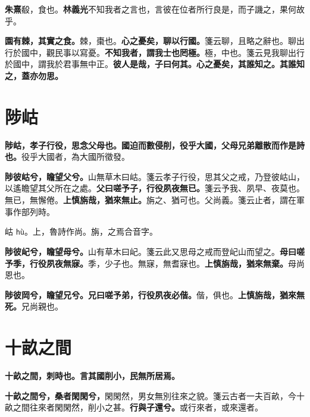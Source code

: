 \begin{quoting}\textbf{朱熹}殽，食也。\textbf{林義光}不知我者之言也，言彼在位者所行良是，而子譏之，果何故乎。\end{quoting}

\textbf{園有棘，其實之食。}{\footnotesize 棘，棗也。}\textbf{心之憂矣，聊以行國。}{\footnotesize 箋云聊，且略之辭也。聊出行於國中，觀民事以寫憂。}\textbf{不知我者，謂我士也罔極。}{\footnotesize 極，中也。箋云見我聊出行於國中，謂我於君事無中正。}\textbf{彼人是哉，子曰何其。心之憂矣，其誰知之。其誰知之，蓋亦勿思。}

\section{陟岵}


\textbf{陟岵，孝子行役，思念父母也。國迫而數侵削，役乎大國，父母兄弟離散而作是詩也。}{\footnotesize 役乎大國者，為大國所徵發。}

\textbf{陟彼岵兮，瞻望父兮。}{\footnotesize 山無草木曰岵。箋云孝子行役，思其父之戒，乃登彼岵山，以遙瞻望其父所在之處。}\textbf{父曰嗟予子，行役夙夜無已。}{\footnotesize 箋云予我、夙早、夜莫也。無已，無懈倦。}\textbf{上慎旃哉，猶來無止。}{\footnotesize 旃之、猶可也。父尚義。箋云止者，謂在軍事作部列時。}

\begin{quoting}岵 \texttt{hù}。上，魯詩作尚。旃，之焉合音字。\end{quoting}

\textbf{陟彼屺兮，瞻望母兮。}{\footnotesize 山有草木曰屺。箋云此又思母之戒而登屺山而望之。}\textbf{母曰嗟予季，行役夙夜無寐。}{\footnotesize 季，少子也。無寐，無耆寐也。}\textbf{上慎旃哉，猶來無棄。}{\footnotesize 母尚恩也。}

\textbf{陟彼岡兮，瞻望兄兮。兄曰嗟予弟，行役夙夜必偕。}{\footnotesize 偕，俱也。}\textbf{上慎旃哉，猶來無死。}{\footnotesize 兄尚親也。}

\section{十畝之間}


\textbf{十畝之間，刺時也。言其國削小，民無所居焉。}

\textbf{十畝之間兮，桑者閑閑兮，}{\footnotesize 閑閑然，男女無別往來之貌。箋云古者一夫百畝，今十畝之間往來者閑閑然，削小之甚。}\textbf{行與子還兮。}{\footnotesize 或行來者，或來還者。}

